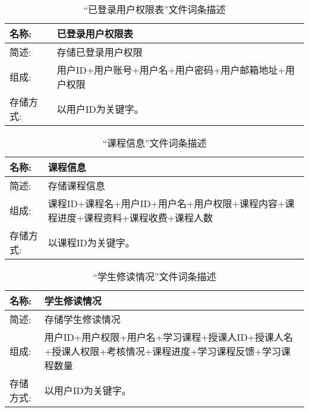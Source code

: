 \begin{table}[H]  
\caption{“已登录用户权限表”文件词条描述}  
\begin{center}  
    \begin{tabular}{l p{10cm}} 
        \hline
        \quad 名称: & 已登录用户权限表 \\
        \hline
        \quad 简述: & 存储已登录用户权限\\
        \hline
        \quad 组成: & 用户ID+用户账号+用户名+用户密码+用户邮箱地址+用户权限 \\
        \hline
        \quad 存储方式: & 以用户ID为关键字。 \\
        \hline
    \end{tabular}
    \label{tab1}
\end{center}
\end{table}

\begin{table}[H]  
\caption{“课程信息”文件词条描述}  
\begin{center}  
    \begin{tabular}{l p{10cm}} 
        \hline
        \quad 名称: & 课程信息 \\
        \hline
        \quad 简述: & 存储课程信息 \\
        \hline
        \quad 组成: & 课程ID+课程名+用户ID+用户名+用户权限+课程内容+课程进度+课程资料+课程收费+课程人数 \\
        \hline
        \quad 存储方式: & 以课程ID为关键字。 \\
        \hline
    \end{tabular}
    \label{tab1}
\end{center}
\end{table}

\begin{table}[H]  
\caption{“学生修读情况”文件词条描述}  
\begin{center}  
    \begin{tabular}{l p{10cm}} 
        \hline
        \quad 名称: & 学生修读情况 \\
        \hline
        \quad 简述: & 存储学生修读情况 \\
        \hline
        \quad 组成: & 用户ID+用户权限+用户名+学习课程+授课人ID+授课人名+授课人权限+考核情况+课程进度+学习课程反馈+学习课程数量  \\
        \hline
        \quad 存储方式: & 以用户ID为关键字。 \\
        \hline
    \end{tabular}
    \label{tab1}
\end{center}
\end{table}